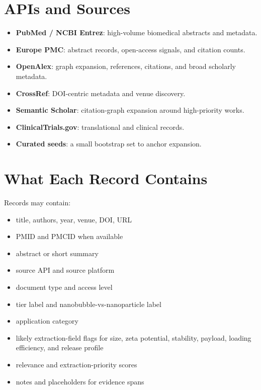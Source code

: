 \documentclass[11pt]{article}
\begin{document}
\section*{APIs and Sources}
\begin{itemize}[leftmargin=1.7em]
    \item \textbf{PubMed / NCBI Entrez}: high-volume biomedical abstracts and metadata.
    \item \textbf{Europe PMC}: abstract records, open-access signals, and citation counts.
    \item \textbf{OpenAlex}: graph expansion, references, citations, and broad scholarly metadata.
    \item \textbf{CrossRef}: DOI-centric metadata and venue discovery.
    \item \textbf{Semantic Scholar}: citation-graph expansion around high-priority works.
    \item \textbf{ClinicalTrials.gov}: translational and clinical records.
    \item \textbf{Curated seeds}: a small bootstrap set to anchor expansion.
\end{itemize}

\section*{What Each Record Contains}
Records may contain:
\begin{itemize}[leftmargin=1.7em]
    \item title, authors, year, venue, DOI, URL
    \item PMID and PMCID when available
    \item abstract or short summary
    \item source API and source platform
    \item document type and access level
    \item tier label and nanobubble-vs-nanoparticle label
    \item application category
    \item likely extraction-field flags for size, zeta potential, stability, payload, loading efficiency, and release profile
    \item relevance and extraction-priority scores
    \item notes and placeholders for evidence spans
\end{itemize}
\end{document}
